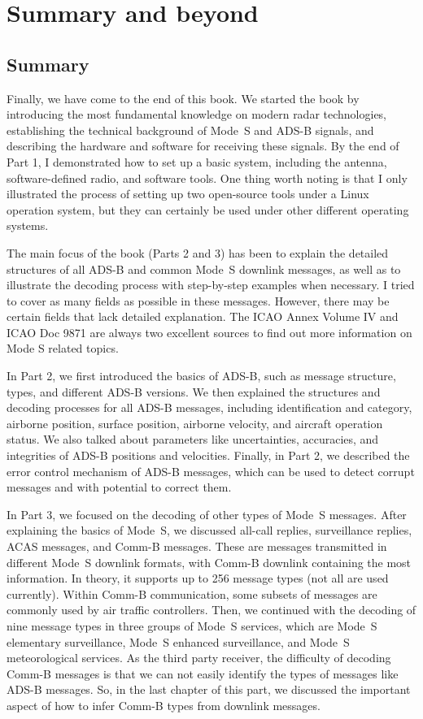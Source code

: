 \chapter{Summary and beyond}

\section{Summary}
Finally, we have come to the end of this book. We started the book by introducing the most fundamental knowledge on modern radar technologies, establishing the technical background of Mode~S and ADS-B signals, and describing the hardware and software for receiving these signals. By the end of Part 1, I demonstrated how to set up a basic system, including the antenna, software-defined radio, and software tools. One thing worth noting is that I only illustrated the process of setting up two open-source tools under a Linux operation system, but they can certainly be used under other different operating systems.

The main focus of the book (Parts 2 and 3) has been to explain the detailed structures of all ADS-B and common Mode~S downlink messages, as well as to illustrate the decoding process with step-by-step examples when necessary. I tried to cover as many fields as possible in these messages. However, there may be certain fields that lack detailed explanation. The ICAO Annex Volume IV and ICAO Doc 9871 are always two excellent sources to find out more information on Mode S related topics.

In Part 2, we first introduced the basics of ADS-B, such as message structure, types, and different ADS-B versions. We then explained the structures and decoding processes for all ADS-B messages, including identification and category, airborne position, surface position, airborne velocity, and aircraft operation status. We also talked about parameters like uncertainties, accuracies, and integrities of ADS-B positions and velocities. Finally, in Part 2, we described the error control mechanism of ADS-B messages, which can be used to detect corrupt messages and with potential to correct them.

In Part 3, we focused on the decoding of other types of Mode~S messages. After explaining the basics of Mode~S, we discussed all-call replies, surveillance replies, ACAS messages, and Comm-B messages. These are messages transmitted in different Mode~S downlink formats, with Comm-B downlink containing the most information. In theory, it supports up to 256 message types (not all are used currently). Within Comm-B communication, some subsets of messages are commonly used by air traffic controllers. Then, we continued with the decoding of nine message types in three groups of Mode~S services, which are Mode~S elementary surveillance, Mode~S enhanced surveillance, and Mode~S meteorological services. As the third party receiver, the difficulty of decoding Comm-B messages is that we can not easily identify the types of messages like ADS-B messages. So, in the last chapter of this part, we discussed the important aspect of how to infer Comm-B types from downlink messages.


